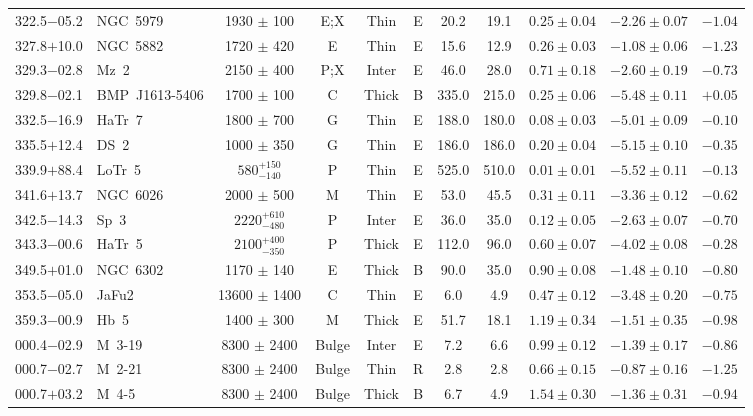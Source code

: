 \documentclass[useAMS]{mn2e}
\begin{document}
\begin{center}
{\begin{longtable}{llccccccccc}
322.5$-$05.2		&	NGC~5979	&	1930	$\pm$	100	&	E;X		&	Thin		&	E		&	20.2		&	19.1		&	$0.25 \pm 0.04$		&	$-2.26 \pm 0.07$		&	$-1.04$	\\
327.8$+$10.0		&	NGC~5882	&	1720	$\pm$	420	&	E		&	Thin		&	E		&	15.6		&	12.9		&	$0.26 \pm 0.03$		&	$-1.08 \pm 0.06$		&	$-1.23$	\\
329.3$-$02.8		&	Mz~2	&	2150	$\pm$	400	&	P;X		&	Inter		&	E		&	46.0		&	28.0		&	$0.71 \pm 0.18$		&	$-2.60 \pm 0.19$		&	$-0.73$	\\
329.8$-$02.1		&	BMP~J1613-5406	&	1700	$\pm$	100	&	C		&	Thick		&	B		&	335.0		&	215.0		&	$0.25 \pm 0.06$		&	$-5.48 \pm 0.11$		&	$+0.05$	\\
332.5$-$16.9		&	HaTr~7	&	1800	$\pm$	700	&	G		&	Thin		&	E		&	188.0		&	180.0		&	$0.08 \pm 0.03$		&	$-5.01 \pm 0.09$		&	$-0.10$	\\
335.5$+$12.4		&	DS~2	&	1000	$\pm$	350	&	G		&	Thin		&	E		&	186.0		&	186.0		&	$0.20 \pm 0.04$		&	$-5.15 \pm 0.10$		&	$-0.35$	\\
339.9$+$88.4		&	LoTr~5	&	$580^{+150}_{-140}$		&	P		&	Thin		&	E		&	525.0		&	510.0		&	$0.01 \pm 0.01$		&	$-5.52 \pm 0.11$		&	$-0.13$	\\
341.6$+$13.7		&	NGC~6026	&	2000	$\pm$	500	&	M		&	Thin		&	E		&	53.0		&	45.5		&	$0.31 \pm 0.11$		&	$-3.36 \pm 0.12$		&	$-0.62$	\\
342.5$-$14.3		&	Sp~3	&	$2220^{+610}_{-480}$		&	P		&	Inter		&	E		&	36.0		&	35.0		&	$0.12 \pm 0.05$		&	$-2.63 \pm 0.07$		&	$-0.70$	\\
343.3$-$00.6		&	HaTr~5	&	$2100^{+400}_{-350}$		&	P		&	Thick		&	E		&	112.0		&	96.0		&	$0.60 \pm 0.07$		&	$-4.02 \pm 0.08$		&	$-0.28$	\\
349.5$+$01.0		&	NGC~6302	&	1170	$\pm$	140	&	E		&	Thick		&	B		&	90.0		&	35.0		&	$0.90 \pm 0.08$		&	$-1.48 \pm 0.10$		&	$-0.80$	\\
353.5$-$05.0		&	JaFu2	&	13600 $\pm$ 1400		&	C		&	Thin		&	E		&	6.0		&	4.9		&	$0.47 \pm 0.12$		&	$-3.48 \pm 0.20$		&	$-0.75$	\\
359.3$-$00.9		&	Hb~5	&	1400	$\pm$	300	&	M		&	Thick		&	E		&	51.7		&	18.1		&	$1.19 \pm 0.34$		&	$-1.51 \pm 0.35$		&	$-0.98$	\\
\hline
000.4$-$02.9		&	M~3-19	&	8300 $\pm$ 2400		&	Bulge		&	Inter		&	E		&	7.2		&	6.6		&	$0.99 \pm 0.12$		&	$-1.39 \pm 0.17$		&	$-0.86$	\\
000.7$-$02.7		&	M~2-21	&	8300 $\pm$ 2400		&	Bulge		&	Thin		&	R		&	2.8		&	2.8		&	$0.66 \pm 0.15$		&	$-0.87 \pm 0.16$		&	$-1.25$	\\
000.7$+$03.2		&	M~4-5	&	8300 $\pm$ 2400		&	Bulge		&	Thick		&	B		&	6.7		&	4.9		&	$1.54 \pm 0.30$		&	$-1.36 \pm 0.31$		&	$-0.94$	\\

\end{longtable}}
\end{center}
\end{document}

